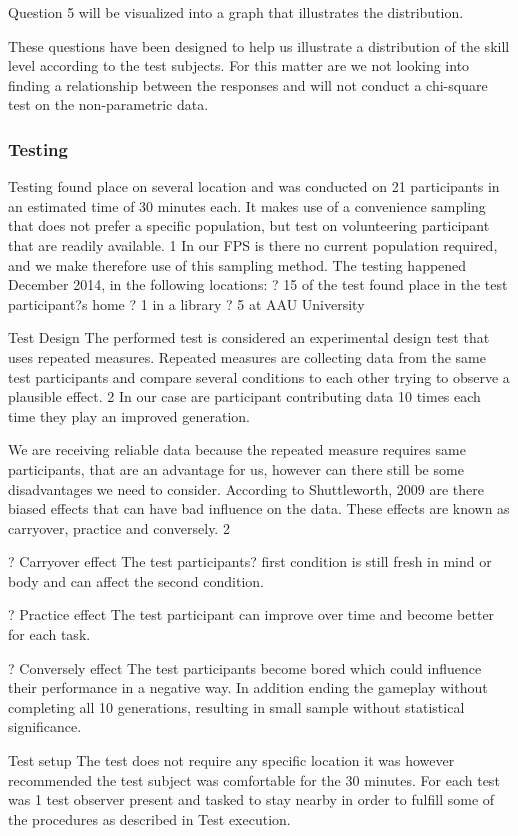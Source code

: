 Question 5 will be visualized into a graph that illustrates the distribution.

These questions have been designed to help us illustrate a distribution of the skill level according to the test subjects. For this matter are we not looking into finding a relationship between the responses and will not conduct a chi-square test on the non-parametric data.

\subsubsection{Testing}
Testing found place on several location and was conducted on 21 participants in an estimated time of 30 minutes each.
It makes use of a convenience sampling that does not prefer a specific population, but test on volunteering participant that are readily available. {1} In our FPS is there no current population required, and we make therefore use of this sampling method. The testing happened December 2014, in the following locations:
?	15 of the test found place in the test participant?s home
?	1 in a library
?	5 at AAU University

Test Design
The performed test is considered an experimental design test that uses repeated measures.
Repeated measures are collecting data from the same test participants and compare several conditions to each other trying to observe a plausible effect. {2} In our case are participant contributing data 10 times each time they play an improved generation.

We are receiving reliable data because the repeated measure requires same participants, that are an advantage for us, however can there still be some disadvantages we need to consider. According to Shuttleworth, 2009 are there biased effects that can have bad influence on the data. These effects are known as carryover, practice and conversely. {2}

?	Carryover effect
The test participants? first condition is still fresh in mind or body and can affect the second condition.

?	Practice effect
The test participant can improve over time and become better for each task.

?	Conversely effect
The test participants become bored which could influence their performance in a negative way. In addition ending the gameplay without completing all 10 generations, resulting in small sample without statistical significance.

Test setup
The test does not require any specific location it was however recommended the test subject was comfortable for the 30 minutes. For each test was 1 test observer present and tasked to stay nearby in order to fulfill some of the procedures as described in Test execution.

